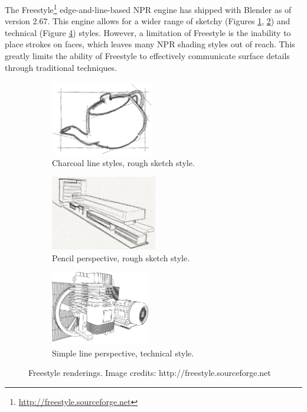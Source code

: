 The Freestyle\footnote{\url{http://freestyle.sourceforge.net}} edge-and-line-based NPR engine has shipped with Blender as of version 2.67. This engine allows for a wider range of sketchy (Figures \ref{ex_sketchy1}, \ref{ex_sketchy2}) and technical (Figure \ref{ex_line}) styles. However, a limitation of Freestyle is the inability to place strokes on faces, which leaves many NPR shading styles out of reach. This greatly limits the ability of Freestyle to effectively communicate surface details through traditional techniques.

\begin{figure}[h]
	\centering
	\begin{subfigure}[b]{0.3\textwidth}
		\includegraphics[height=3.25cm]{images/ex_sketchy1}
		\caption{Charcoal line styles, rough sketch style.}\label{ex_sketchy1}
	\end{subfigure}
	\begin{subfigure}[b]{0.3\textwidth}
		\includegraphics[height=3.25cm]{images/ex_sketchy2}
		\caption{Pencil perspective, rough sketch style.}\label{ex_sketchy2}
	\end{subfigure}
	\begin{subfigure}[b]{0.3\textwidth}
		\includegraphics[height=3.25cm]{images/ex_line}
		\caption{Simple line perspective, technical style.}\label{ex_line}
	\end{subfigure}
	\caption{Freestyle renderings. Image credits: http://freestyle.sourceforge.net}
\end{figure}

